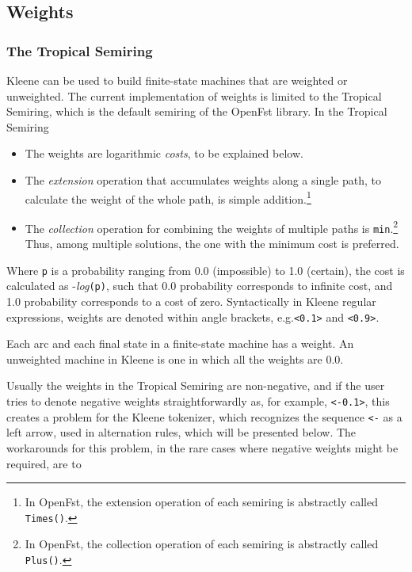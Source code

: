 \subsection{Weights}

\subsubsection{The Tropical Semiring}  

Kleene can be used to build finite-state machines that are weighted or unweighted.
The current implementation of weights is limited to the
Tropical Semiring, which is the default semiring of the OpenFst library.
In the Tropical Semiring

\begin{itemize}
\item
The weights are logarithmic \emph{costs}, to be explained below.
\item
The \emph{extension} operation that accumulates weights along a single
path, to calculate the weight of the whole path, is simple addition.\footnote{In OpenFst, the extension operation of
each
semiring is abstractly called \texttt{Times()}.}
\item
The \emph{collection} operation for combining the weights of multiple
paths is \texttt{min}.\footnote{In OpenFst, the collection
operation of each semiring is abstractly called \texttt{Plus()}.}
Thus, among multiple solutions, the one with the minimum cost is preferred.
\end{itemize}

\noindent
Where \texttt{p} is a probability ranging from 0.0 (impossible) to
1.0 (certain), the cost is calculated as -\emph{log}\texttt{(p)},
such that 0.0 probability corresponds to infinite cost, and 1.0
probability corresponds to a cost of zero.
Syntactically in Kleene regular expressions, weights are denoted within angle brackets,
e.g.\@ \texttt{<0.1>} and \texttt{<0.9>}. 

Each arc and each final state in a finite-state machine has a weight.  An unweighted
machine in Kleene is one in which all the weights are 0.0.

Usually the weights in
the Tropical Semiring are non-negative, and if the user tries to
denote negative weights straightforwardly as, for example, \@ \texttt{<-0.1>}, this
creates a problem for the Kleene tokenizer, which recognizes the
sequence \texttt{<-} as a left arrow, used in alternation rules, which
will be presented below.
The workarounds for this problem, in the rare cases where negative
weights might be required,
are to

